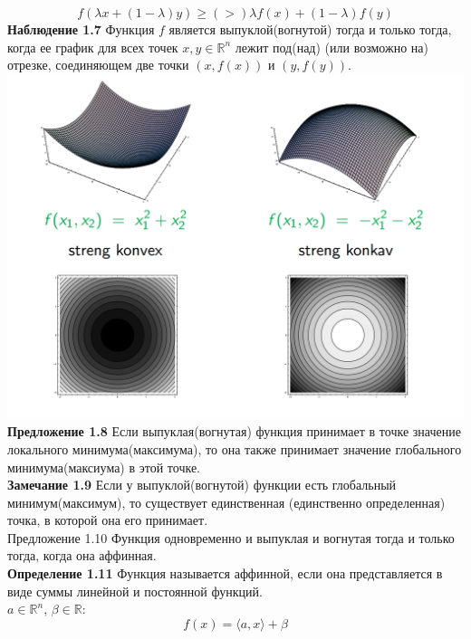 \begin{equation*}
f(\lambda x+(1-\lambda )y)\geq (>) \lambda f(x)+(1-\lambda )f(y)
\end{equation*}
\textbf{Наблюдение 1.7} Функция $f$ является выпуклой(вогнутой) тогда и только тогда, когда ее график для всех точек $x,y \in \mathbb{R}^{n}$ лежит под(над) (или возможно на) отрезке, соединяющем две точки $(x,f(x))$ и $(y,f(y))$.\vspace{.1 cm}\\
\includegraphics[scale=0.5]{konvex_konkav.png}
\textbf{Предложение 1.8} Если выпуклая(вогнутая) функция принимает в точке значение локального минимума(максимума), то она также принимает значение глобального минимума(максиума) в этой точке.\vspace{.1 cm}\\
\textbf{Замечание 1.9} Если у выпуклой(вогнутой) функции есть глобальный минимум(максимум), то существует единственная (единственно определенная) точка, в которой она его принимает.\vspace{.1 cm}\\
Предложение 1.10 Функция одновременно и выпуклая и вогнутая тогда и только тогда, когда она аффинная.\vspace{.1 cm}\\
\textbf{Определение 1.11} Функция называется аффинной, если она представляется в виде суммы линейной и постоянной функций.\\
$a\in \mathbb{R}^{n}$, $\beta \in \mathbb{R}$:
\begin{equation*}
f(x)=\langle a,x \rangle +\beta
\end{equation*}
